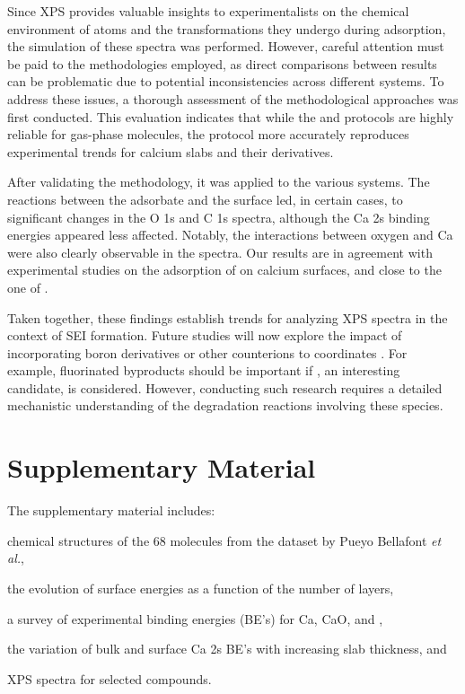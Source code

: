 \documentclass[%
aip,
amsmath,amssymb,
preprint,%
jcp,
showkeys,
]{revtex4-2}
\begin{document}
Since XPS provides valuable insights  to experimentalists on the chemical environment of atoms and the transformations they undergo during adsorption, the simulation of these spectra was performed. However, careful attention must be paid to the methodologies employed, as direct comparisons between results can be problematic due to potential inconsistencies across different systems. To address these issues, a thorough assessment of the methodological approaches was first conducted. This evaluation indicates that while the  and  protocols are highly reliable for gas-phase molecules, the  protocol more accurately reproduces experimental trends for calcium slabs and their derivatives.

After validating the methodology, it was applied to the various systems. The reactions between the adsorbate and the surface led,  in certain cases, to significant changes in the O 1s and C 1s spectra, although the Ca 2s binding energies appeared less affected. Notably, the interactions between oxygen and Ca were also clearly observable in the spectra. Our results are in agreement with experimental studies on the adsorption of  on calcium surfaces, and close to the one of .\cite{voigtsAdsorptionCO2CO2009}

Taken together, these findings establish trends for analyzing XPS spectra in the context of SEI formation. Future studies will now explore the impact of incorporating boron derivatives or other counterions to coordinates . For example, fluorinated byproducts should be important if  , an interesting candidate,\cite{bodinBoronBasedFunctionalAdditives2023} is considered. However, conducting such research requires a detailed mechanistic understanding of the degradation reactions involving these species.\cite{youngPreventingElectrolyteDecomposition2021,yamijalaStabilityCalciumIon2021,baonguyenInvestigatingAbnormalConductivity2022,nguyenSolvationReductionCoupling2023}


\section*{Supplementary Material}

The supplementary material includes: \begin{inparaenum}[(i)]
	\item chemical structures of the 68 molecules from the dataset by Pueyo Bellafont \textit{et al.}\cite{pueyobellafontPredictingCoreLevel2017},
	\item the evolution of surface energies as a function of the number of layers,
	\item a survey of experimental binding energies (BE's) for Ca, CaO, and ,
	\item the variation of bulk and surface Ca 2s BE's with increasing slab thickness, and
	\item XPS spectra for selected compounds.
\end{inparaenum}
\end{document}
